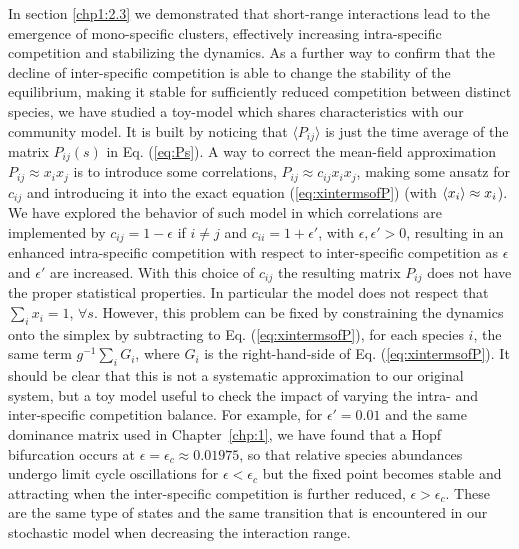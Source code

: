 In section \ref{chp1:2.3} we demonstrated that short-range interactions lead to the emergence of mono-specific clusters, effectively increasing intra-specific competition and 
stabilizing the dynamics.  As a further way to confirm that the decline of  inter-specific
competition is able to change the stability of the equilibrium,
making it stable for sufficiently reduced competition between
distinct species, we have studied a toy-model which shares
characteristics with our community model. It is built by
noticing that $\langle P_{ij} \rangle$ is just the time average
of the matrix $P_{ij}(s)$ in Eq. (\ref{eq:Ps}).
A way to correct the mean-field approximation $ P_{ij} \approx
x_i x_j$ is to introduce some correlations, $ P_{ij} \approx
c_{ij}x_i x_j$, making some ansatz for $c_{ij}$ and introducing it
into the exact equation (\ref{eq:xintermsofP}) (with
$\left\langle x_i\right\rangle\approx x_i$). We have explored the behavior of such
model in which correlations are implemented by
$c_{ij}=1-\epsilon$ if $i\neq j$ and $c_{ii}=1+\epsilon'$, with $\epsilon,\epsilon'>0$, 
resulting in an enhanced intra-specific competition with respect to
 inter-specific competition as $\epsilon$ and $\epsilon'$ are
increased. With this choice of $c_{ij}$ the resulting matrix
$P_{ij}$ does not have the proper statistical properties. In
particular the model does not respect that $\sum_i x_i=1$,
$\forall s$. However, this problem can be fixed by
constraining the dynamics onto the simplex by subtracting to
Eq. (\ref{eq:xintermsofP}), for each species $i$, the same term
$g^{-1}\sum_i G_i$, where $G_i$ is the right-hand-side of Eq.
(\ref{eq:xintermsofP}). It should be clear that this is not a
systematic approximation to our original system, but a toy
model useful to check the impact of varying the intra- and inter-specific competition balance. For example, for
$\epsilon'=0.01$ and the same dominance matrix used in Chapter~\ref{chp:1}, we have found that a Hopf bifurcation occurs at
$\epsilon = \epsilon_c\approx 0.01975$, so that relative
species abundances undergo limit cycle oscillations for
$\epsilon<\epsilon_c$ but the fixed point becomes stable and
attracting when the inter-specific competition is further
reduced, $\epsilon>\epsilon_c$. These are the same type of
states and the same transition that is encountered in our
stochastic model when decreasing the interaction range.
